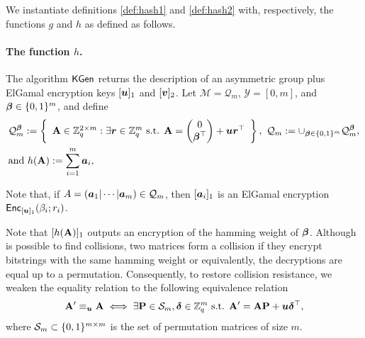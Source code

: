 
We instantiate definitions \ref{def:hash1} and \ref{def:hash2}  with, respectively, the functions $g$ and $h$ as defined as follows.

\paragraph{The function $h$.} The algorithm $\mathsf{KGen}$ returns the description of an asymmetric group plus ElGamal encryption keys $[{\boldsymbol{u}}]_1$  and $[{\boldsymbol{v}}]_2$. Let $\mathcal{M}=\mathcal{Q}_m$, $\mathcal{Y}=[0,m]$, and ${\boldsymbol{\beta}}\in\{0,1\}^m$, and define
\begin{align*}
&\mathcal{Q}_m^{\boldsymbol{\beta}} := \left\{
\begin{array}{c}
\mathbf{{A}} \in \mathbb{Z}_q^{2\times m}:
\exists {\boldsymbol{r}}\in\mathbb{Z}_q^m\text{ s.t. }
{\mathbf{{A}} = \left(\begin{matrix}0\\{\boldsymbol{\beta}}^\top\end{matrix}\right)+{\boldsymbol{u}}{\boldsymbol{r}}^\top
}
\end{array}\right\},
\ \mathcal{Q}_m := \cup_{{\boldsymbol{\beta}}\in\{0,1\}^m} \mathcal{Q}_m^{\boldsymbol{\beta}},\\
&\text{and } h(\mathbf{{A}}):= \sum_{i=1}^m{\boldsymbol{a}}_i,
\end{align*}

Note that, if $A=({\boldsymbol{a}}_1|\cdots|{\boldsymbol{a}}_m)\in\mathcal{Q}_m$, then $[{\boldsymbol{a}}_i]_1$ is an ElGamal encryption $\mathsf{Enc}_{[{\boldsymbol{u}}]_1}(\beta_i;r_i)$.



Note that $[h(\mathbf{{A}})]_1$ outputs an encryption of the hamming weight of ${\boldsymbol{\beta}}$. Although is possible to find collisions, two matrices form a collision if they encrypt bitstrings with the same hamming weight or equivalently, the decryptions are equal up to a permutation. Consequently, to restore collision resistance, we weaken the equality relation to the following equivalence relation
$$
\mathbf{{A}}' \equiv_{\boldsymbol{u}} \mathbf{{A}} \iff \exists \mathbf{{P}}\in\mathcal{S}_m, {\boldsymbol{\delta}}\in\mathbb{Z}_q^m \text{ s.t. } \mathbf{{A}}' = \mathbf{{A}}\mathbf{{P}} + {\boldsymbol{u}}{\boldsymbol{\delta}}^\top,
$$
where $\mathcal{S}_m\subset \{0,1\}^{m\times m}$ is the set of permutation matrices of size $m$.


